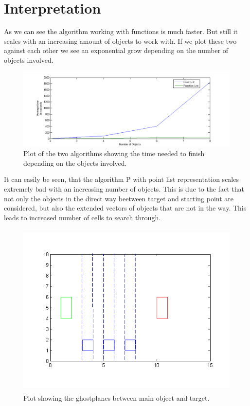 
\section{Interpretation}
As we can see the algorithm working with functions is much faster. But still it scales with an increasing amount of objects to work with.
If we plot these two against each other we see an exponential grow depending on the number of objects involved.
\begin{figure}[H]
\includegraphics[width=\textwidth]{pointAgainstFunc.png}
\caption{ Plot of the two algorithms showing the time needed to finish depending on the objects involved.}
\end{figure}
It can easily be seen, that the algorithm P with point list representation scales extremely bad with an increasing number of objects. This is due to the fact that not only the objects in the direct way beetween target and starting point are considered, but also the extended vectors of objects that are not in the way. This leads to increased number of cells to search through.
\begin{figure}[H]
\centering
\includegraphics[width=\textwidth, height=250pt]{ghostplanesStep}
\caption{Plot showing the ghostplanes between main object and target.}
\end{figure}
